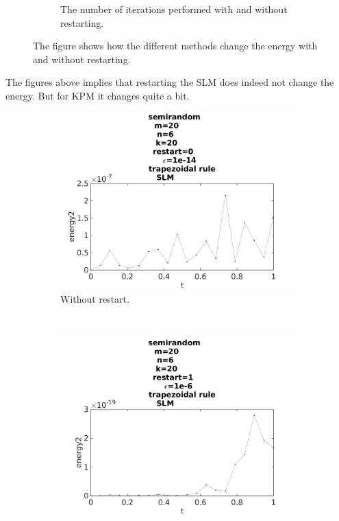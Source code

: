 \begin{figure}[H]
\begin{subfigure}[b]{0.45\textwidth}
                \caption{ The number of iterations performed with and without restarting.  }
                \label{fig:compareIter}
        \end{subfigure}
        \caption{ The figure shows how the different methods change the energy with and without restarting.  }
        \label{fig:compare}
\end{figure}

The figures above implies that restarting the SLM does indeed not change the energy. But for KPM it changes quite a bit. 

\begin{figure}[H]
        \centering
        \begin{subfigure}[b]{0.3\textwidth}
                \includegraphics[width=\textwidth]{../MATLAB/fig/energytestrestart02.jpg}
                \caption{ Without restart. }
                \label{fig:energytestrestart02}
        \end{subfigure}
        ~
        \begin{subfigure}[b]{0.3\textwidth}
                \includegraphics[width=\textwidth]{../MATLAB/fig/energytestrestart22.jpg}

\end{subfigure}
\end{figure}
